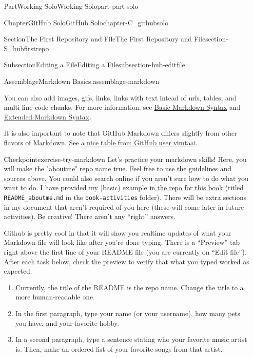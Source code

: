 \documentclass[oneside,10pt,]{book}
\newcommand{\mono}[1]{\texttt{#1}}
\begin{document}
\begin{partptx}{Part}{Working Solo}{}{Working Solo}{}{}{part-part-solo}
\begin{chapterptx}{Chapter}{GitHub Solo}{}{GitHub Solo}{}{}{chapter-C_githubsolo}
\begin{sectionptx}{Section}{The First Repository and File}{}{The First Repository and File}{}{}{section-S_hubfirstrepo}
\begin{subsectionptx}{Subsection}{Editing a File}{}{Editing a File}{}{}{subsection-hub-editfile}
\begin{assemblage}{Assemblage}{Markdown Basics.}{assemblage-markdown}
\begin{itemize}[label=\textbullet]
\end{itemize}
You can also add images, gifs, links, links with text intead of urls, tables, and multi-line code chunks. For more information, see \href{https://www.markdownguide.org/basic-syntax/}{Basic Markdown Syntax}\footnotemark{} and \href{https://www.markdownguide.org/extended-syntax/}{Extended Markdown Syntax}\footnotemark{}.%
\par
It is also important to note that GitHub Markdown differs slightly from other flavors of Markdown. See \href{https://gist.github.com/vimtaai/99f8c89e7d3d02a362117284684baa0f}{a nice table from GitHub user vimtaai}\footnotemark{}.%
\end{assemblage}
%
%
%
\begin{inlineexercise}{Checkpoint}{}{exercise-try-markdown}%
%
Let's practice your markdown skills! Here, you will make the "aboutme" repo name true. Feel free to use the guidelines and sources above. You could also search online if you aren't sure how to do what you want to do. I have provided my (basic) example \href{https://github.com/ian-curtis/gitstarted}{in the repo for this book}\footnotemark{} (titled \mono{README\_aboutme.md} in the \mono{book-activities} folder). There will be extra sections in my document that aren't required of you here (these will come later in future activities). Be creative! There aren't any ``right'' answers.%
\par
Github is pretty cool in that it will show you realtime updates of what your Markdown file will look like after you're done typing. There is a ``Preview'' tab right above the first line of your README file (you are currently on ``Edit file''). After each task below, check the preview to verify that what you typed worked as expected.%
\begin{enumerate}[font=\bfseries,label=(\alph*),ref=\alph*]%
\item{}Currently, the title of the README is the repo name. Change the title to a more human-readable one.%
\item{}In the first paragraph, type your name (or your username), how many pets you have, and your favorite hobby.%
\item{}In a second paragraph, type a sentence stating who your favorite music artist is. Then, make an ordered list of your favorite songs from that artist.%

\end{enumerate}
\end{inlineexercise}
\end{subsectionptx}
\end{sectionptx}
\end{chapterptx}
\end{partptx}
\end{document}
